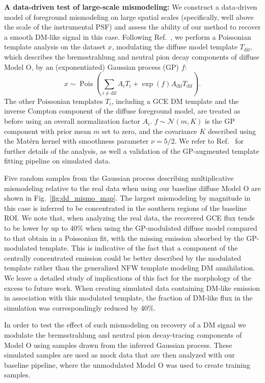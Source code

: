 \documentclass[prd,aps,10pt,nofootinbib,twocolumn,superscriptaddress,preprintnumbers,balancelastpage,longbibliography]{revtex4-1}
\begin{document}
\noindent
\textbf{A data-driven test of large-scale mismodeling:}
We construct a data-driven model of foreground mismodeling on large spatial scales (specifically, well above the scale of the instrumental PSF) and assess the ability of our method to recover a smooth DM-like signal in this case. Following Ref.~\cite{Mishra-Sharma:2020kjb}, we perform a Poissonian template analysis on the \Fermi dataset $x$, modulating the diffuse model template $T_{\mathrm{dif}}$, which describes the bremsstrahlung and neutral pion decay components of diffuse Model O, by an (exponentiated) Gaussian process (GP) $f$:
\begin{equation}
x \sim \operatorname{Pois}\left(\sum_{i \neq \mathrm{dif}} A_{i} T_{i}+\exp \left(f\right) A_{\mathrm{dif}} T_{\mathrm{dif}}\right).
\end{equation}
The other Poissonian templates $T_{i}$, including a GCE DM template and the inverse Compton component of the diffuse foreground model, are treated as before using an overall normalization factor $A_{i}$. $f \sim \mathcal{N}(m, K)$ is the GP component with prior mean $m$ set to zero, and the covariance $K$ described using the Mat\'ern kernel with smoothness parameter $\nu = 5/2$. We refer to Ref.~\cite{Mishra-Sharma:2020kjb} for further details of the analysis, as well a validation of the GP-augmented template fitting pipeline on simulated data.

Five random samples from the Gaussian process describing multiplicative mismodeling relative to the real \Fermi data when using our baseline diffuse Model O are shown in Fig.~\ref{fig:dd_mismo_map}. The largest mismodeling by magnitude in this case is inferred to be concentrated in the southern regions of the baseline ROI. We note that, when analyzing the real \Fermi data, the recovered GCE flux tends to be lower by up to 40\% when using the GP-modulated diffuse model compared to that obtain in a Poissonian fit, with the missing emission absorbed by the GP-modulated template. This is indicative of the fact that a component of the centrally concentrated emission could be better described by the modulated template rather than the generalized NFW template modeling DM annihilation. We leave a detailed study of implications of this fact for the morphology of the excess to future work. When creating simulated data containing DM-like emission in association with this modulated template, the fraction of DM-like flux in the simulation was correspondingly reduced by 40\%.

In order to test the effect of such mismodeling on recovery of a DM signal we modulate the bremsstrahlung and neutral pion decay-tracing components of Model O using samples drawn from the inferred Gaussian process. These simulated samples are used as mock data that are then analyzed with our baseline pipeline, where the unmodulated Model O was used to create training samples.
\end{document}
